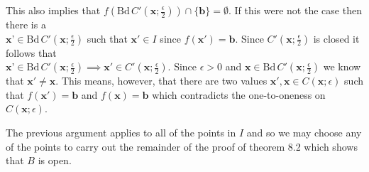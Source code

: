 \documentclass[11pt,reqno]{article}
\begin{document}
This also implies that $f(\text{Bd} \,C'(\textbf{x};\frac{\epsilon}{2})) \cap \{ \textbf{b} \} = \emptyset$. If this were not the case then there is a \\$\textbf{x'} \in \text{Bd} \,C'(\textbf{x};\frac{\epsilon}{2})$ such that $\textbf{x}' \in I$ since $f(\textbf{x}') = \textbf{b}$. Since $C'(\textbf{x};\frac{\epsilon}{2})$ is closed it follows that \\$\textbf{x'} \in \text{Bd} \,C'(\textbf{x};\frac{\epsilon}{2}) \implies \textbf{x}' \in C'(\textbf{x};\frac{\epsilon}{2})$. Since $\epsilon > 0$ and $\textbf{x} \in  \text{Bd} \,C'(\textbf{x};\frac{\epsilon}{2})$ we know that $\textbf{x}' \neq \textbf{x}$. This means, however, that there are two values $\textbf{x}',\textbf{x} \in C(\textbf{x};\epsilon)$ such that $f(\textbf{x}') = \textbf{b}$ and $f(\textbf{x}) = \textbf{b}$ which contradicts the one-to-oneness on $C(\textbf{x};\epsilon)$.

The previous argument applies to all of the points in $I$ and so we may choose any of the points to carry out the remainder of the proof of theorem 8.2 which shows that $B$ is open.
\end{document}
